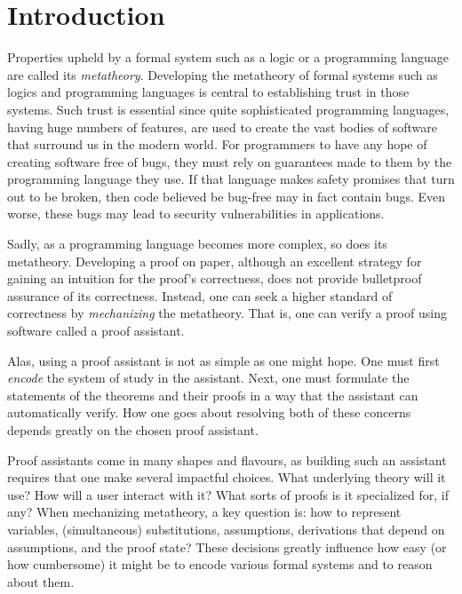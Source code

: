 \chapter{Introduction}
\label{chap:introduction}

Properties upheld by a formal system such as a logic or a programming language
are called its \emph{metatheory}.
Developing the metatheory of formal systems such as logics and programming
languages is central to establishing trust in those systems.
Such trust is essential since quite sophisticated programming languages, having
huge numbers of features, are used to create the vast bodies of software that
surround us in the modern world.
For programmers to have any hope of creating software free of bugs, they must
rely on guarantees made to them by the programming language they use.
If that language makes safety promises that turn out to be broken, then code
believed be bug-free may in fact contain bugs.
Even worse, these bugs may lead to security vulnerabilities in applications.
%

Sadly, as a programming language becomes more complex, so does its metatheory.
Developing a proof on paper, although an excellent strategy for gaining an
intuition for the proof's correctness, does not provide bulletproof assurance of
its correctness.
Instead, one can seek a higher standard of correctness by \emph{mechanizing} the
metatheory.
That is, one can verify a proof using software called a proof assistant.

Alas, using a proof assistant is not as simple as one might hope.
One must first \emph{encode} the system of study in the assistant.
Next, one must formulate the statements of the theorems and their proofs in a
way that the assistant can automatically verify.
How one goes about resolving both of these concerns depends greatly on the
chosen proof assistant.

Proof assistants come in many shapes and flavours, as building such an
assistant requires that one make several impactful choices.
What underlying theory will it use?
How will a user interact with it?
What sorts of proofs is it specialized for, if any?
When mechanizing metatheory, a key question is:
how to represent variables, (simultaneous) substitutions, assumptions,
derivations that depend on assumptions, and the proof state?
These decisions greatly influence how easy (or how cumbersome) it might be to
encode various formal systems and to reason about them.

